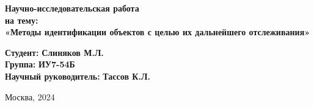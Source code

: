 \begin{titlepage}
    \begin{center}
        \Large\textbf{Научно-исследовательская работа} \\
        \vspace{0.5cm}
        \Large\textbf{на тему:} \\
        \LARGE\textbf{«Методы идентификации объектов с целью их дальнейшего отслеживания»}
    \end{center}
    
    \vspace{2cm}
    
    \noindent\textbf{Студент:} \hfill \textbf{Слиняков М.Л.} \\
    \noindent\textbf{Группа:} \hfill \textbf{ИУ7-54Б} \\
    \noindent\textbf{Научный руководитель:} \hfill \textbf{Тассов К.Л.}
    
    \begin{center}
        \vfill
        Москва, 2024
    \end{center}
    \restoregeometry
\end{titlepage}
